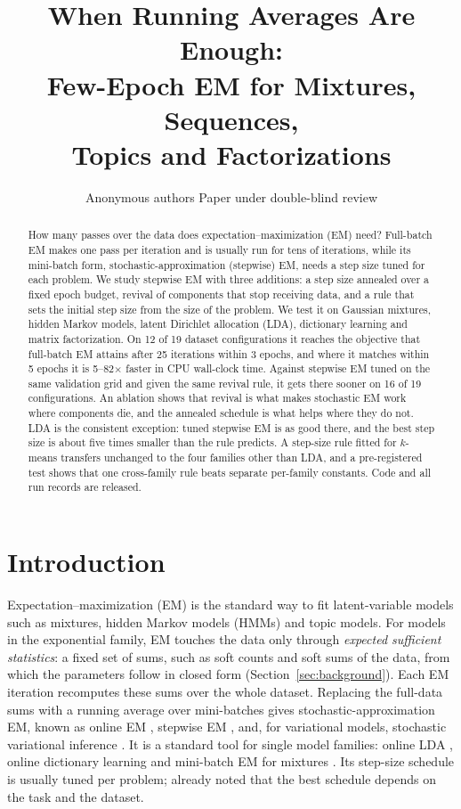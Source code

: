 \documentclass[10pt]{article}
\title{When Running Averages Are Enough:\\ Few-Epoch EM for Mixtures, Sequences,\\ Topics and Factorizations}
\author{\name Anonymous authors \addr Paper under double-blind review}
\begin{document}
\maketitle

\begin{abstract}
How many passes over the data does expectation--maximization (EM) need? Full-batch EM makes one pass per iteration
and is usually run for tens of iterations, while its mini-batch form, stochastic-approximation (stepwise) EM, needs a
step size tuned for each problem. We study stepwise EM with three additions: a step size annealed over a fixed epoch
budget, revival of components that stop receiving data, and a rule that sets the initial step size from the size of
the problem. We test it on Gaussian mixtures, hidden Markov models, latent Dirichlet allocation (LDA), dictionary
learning and matrix factorization. On 12 of 19 dataset configurations it reaches the objective that full-batch EM
attains after 25 iterations within 3 epochs, and where it matches within 5 epochs it is 5--82$\times$ faster in CPU
wall-clock time. Against stepwise EM tuned on the same validation grid and given the same revival rule, it gets there
sooner on 16 of 19 configurations. An ablation shows that revival is what makes stochastic EM work where components
die, and the annealed schedule is what helps where they do not. LDA is the consistent exception: tuned stepwise EM is
as good there, and the best step size is about five times smaller than the rule predicts. A step-size rule fitted for
$k$-means transfers unchanged to the four families other than LDA, and a pre-registered test shows that one cross-family rule
beats separate per-family constants. Code and all run records are released.
\end{abstract}

\section{Introduction}

Expectation--maximization (EM) is the standard way to fit latent-variable models such as mixtures, hidden Markov
models (HMMs) and topic models. For models in the exponential family, EM touches the data only through \emph{expected
sufficient statistics}: a fixed set of sums, such as soft counts and soft sums of the data, from which the parameters
follow in closed form (Section~\ref{sec:background}). Each EM iteration recomputes these sums over the whole dataset.
Replacing the full-data sums with a running average over mini-batches gives stochastic-approximation EM, known as
online EM \citep{sato2000online,cappe2009online}, stepwise EM \citep{liang2009online}, and, for variational models,
stochastic variational inference \citep{hoffman2013svi}. It is a standard tool for single model families: online LDA
\citep{hoffman2010online}, online dictionary learning \citep{mairal2010online} and mini-batch EM for mixtures
\citep{nguyen2020minibatch}. Its step-size schedule is usually tuned per problem; \citet{liang2009online} already
noted that the best schedule depends on the task and the dataset.
\end{document}
